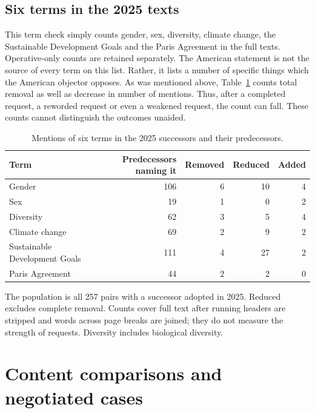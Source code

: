 \documentclass[10pt,authoryear]{elsarticle}
\begin{document}
\subsection{Six terms in the 2025 texts}

This term check simply counts gender, sex, diversity, climate change, the Sustainable Development Goals and the Paris Agreement in the full texts. Operative-only counts are retained separately. The American statement is not the source of every term on this list. Rather, it lists a number of specific things which the American objector opposes. As was mentioned above, Table~\ref{tab:contested_terms} counts total removal as well as decrease in number of mentions. Thus, after a completed request, a reworded request or even a weakened request, the count can fall. These counts cannot distinguish the outcomes unaided.

\begin{table}[ht]
\centering\small
\caption{Mentions of six terms in the 2025 successors and their predecessors.}
\label{tab:contested_terms}
\begin{tabularx}{\textwidth}{>{\raggedright\arraybackslash}Xrrrr}\toprule
Term & Predecessors naming it & Removed & Reduced & Added\\\midrule
Gender & 106 & 6 & 10 & 4\\
Sex & 19 & 1 & 0 & 2\\
Diversity & 62 & 3 & 5 & 4\\
Climate change & 69 & 2 & 9 & 2\\
Sustainable Development Goals & 111 & 4 & 27 & 2\\
Paris Agreement & 44 & 2 & 2 & 0\\
\bottomrule
\end{tabularx}
\begin{minipage}{\textwidth}\footnotesize The population is all 257 pairs with a successor adopted in 2025. Reduced excludes complete removal. Counts cover full text after running headers are stripped and words across page breaks are joined; they do not measure the strength of requests. Diversity includes biological diversity.\end{minipage}
\end{table}

\section{Content comparisons and negotiated cases}
\label{sec:content-cases}
\end{document}
